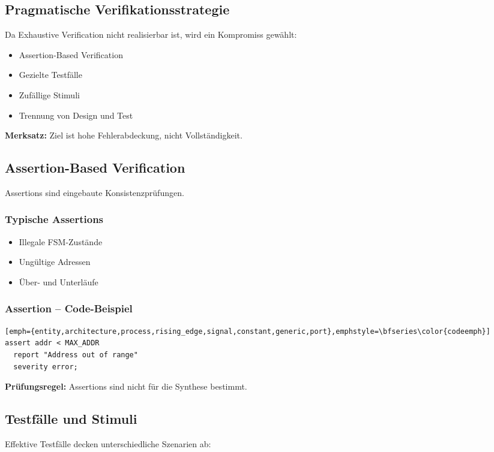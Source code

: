 \documentclass[10pt,a4paper]{article}
\newcommand{\hilite}[1]{\colorbox{yellow!25}{#1}}
\newcommand{\imp}[1]{\textbf{\textcolor{codeemph}{#1}}}
\begin{document}
\begin{multicols}{3}
\subsection{Pragmatische Verifikationsstrategie}
Da Exhaustive Verification nicht realisierbar ist, wird ein Kompromiss gewählt:

\begin{itemize}
  \item Assertion-Based Verification
  \item Gezielte Testfälle
  \item Zufällige Stimuli
  \item Trennung von Design und Test
\end{itemize}

\textbf{Merksatz:}  
\hilite{Ziel} ist \hilite{hohe} \hilite{Fehlerabdeckung}, nicht Vollständigkeit.

\subsection{Assertion-Based Verification}
Assertions sind eingebaute Konsistenzprüfungen.

\subsubsection*{Typische Assertions}
\begin{itemize}
  \item Illegale FSM-Zustände
  \item Ungültige Adressen
  \item Über- und Unterläufe
\end{itemize}

\subsubsection*{Assertion – Code-Beispiel}
\begin{lstlisting}[emph={entity,architecture,process,rising_edge,signal,constant,generic,port},emphstyle=\bfseries\color{codeemph}][emph={entity,architecture,process,rising_edge,signal,constant,generic,port},emphstyle=\bfseries\color{codeemph}]
assert addr < MAX_ADDR
  report "Address out of range"
  severity error;
\end{lstlisting}

\imp{Prüfungsregel:}  
\hilite{Assertions} sind nicht für die \hilite{Synthese} \hilite{bestimmt}.

\subsection{Testfälle und Stimuli}
Effektive Testfälle decken unterschiedliche Szenarien ab:


\end{multicols}
\end{document}
